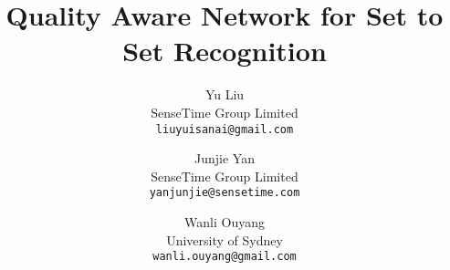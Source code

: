\documentclass[10pt,twocolumn,letterpaper]{article}
\begin{document}
\title{Quality Aware Network for Set to Set Recognition}

\author{Yu Liu\\
SenseTime Group Limited\\
{\tt\small liuyuisanai@gmail.com}
\and
Junjie Yan\\
SenseTime Group Limited\\
{\tt\small yanjunjie@sensetime.com}
\and
Wanli Ouyang\\
University of Sydney\\
{\tt\small wanli.ouyang@gmail.com}
}

\maketitle







\newpage
\begin{spacing}{0.1}


\end{spacing}
\end{document}
